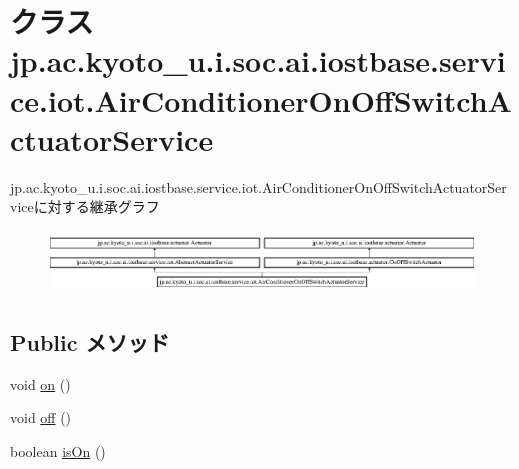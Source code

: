 \hypertarget{classjp_1_1ac_1_1kyoto__u_1_1i_1_1soc_1_1ai_1_1iostbase_1_1service_1_1iot_1_1_air_conditioner_on_off_switch_actuator_service}{\section{クラス jp.\-ac.\-kyoto\-\_\-u.\-i.\-soc.\-ai.\-iostbase.\-service.\-iot.\-Air\-Conditioner\-On\-Off\-Switch\-Actuator\-Service}
\label{classjp_1_1ac_1_1kyoto__u_1_1i_1_1soc_1_1ai_1_1iostbase_1_1service_1_1iot_1_1_air_conditioner_on_off_switch_actuator_service}
}
jp.\-ac.\-kyoto\-\_\-u.\-i.\-soc.\-ai.\-iostbase.\-service.\-iot.\-Air\-Conditioner\-On\-Off\-Switch\-Actuator\-Serviceに対する継承グラフ\begin{figure}[H]
\begin{center}
\leavevmode
\includegraphics[height=1.666667cm]{classjp_1_1ac_1_1kyoto__u_1_1i_1_1soc_1_1ai_1_1iostbase_1_1service_1_1iot_1_1_air_conditioner_on_off_switch_actuator_service}
\end{center}
\end{figure}
\subsection*{Public メソッド}
\begin{DoxyCompactItemize}
\item 
void \hyperlink{classjp_1_1ac_1_1kyoto__u_1_1i_1_1soc_1_1ai_1_1iostbase_1_1service_1_1iot_1_1_air_conditioner_on_off_switch_actuator_service_ae439c71c4d6d3944e221579dd2ff2a0d}{on} ()
\item 
void \hyperlink{classjp_1_1ac_1_1kyoto__u_1_1i_1_1soc_1_1ai_1_1iostbase_1_1service_1_1iot_1_1_air_conditioner_on_off_switch_actuator_service_a8834b7fe2f9bc02c4df6f79f5533cbde}{off} ()
\item 
boolean \hyperlink{classjp_1_1ac_1_1kyoto__u_1_1i_1_1soc_1_1ai_1_1iostbase_1_1service_1_1iot_1_1_air_conditioner_on_off_switch_actuator_service_a348cde087434890efb1aa8f19c0c47d1}{is\-On} ()
\end{DoxyCompactItemize}


